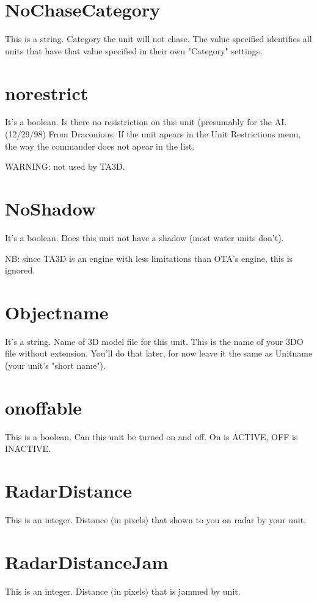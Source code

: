 \documentclass[a4paper,10pt]{article}
\begin{document}
\section{NoChaseCategory}
This is a string. Category the unit will not chase. The value specified identifies all units that have that value specified in their own "Category" settings.

\section{norestrict}
It's a boolean. Is there no resistriction on this unit (presumably for the AI.  (12/29/98) From Draconious:  If the unit apears in the Unit Restrictions menu, the way the commander does not apear in the list.

WARNING: not used by TA3D.

\section{NoShadow}
It's a boolean. Does this unit not have a shadow (most water units don't).

NB: since TA3D is an engine with less limitations than OTA's engine, this is ignored.

\section{Objectname}
It's a string. Name of 3D model file for this unit. This is the name of your 3DO file without extension. You'll do that later, for now leave it the same as Unitname (your unit's "short name").

\section{onoffable}
This is a boolean. Can this unit be turned on and off. On is ACTIVE, OFF is INACTIVE.

\section{RadarDistance}
This is an integer. Distance (in pixels) that shown to you on radar by your unit.

\section{RadarDistanceJam}
This is an integer. Distance (in pixels) that is jammed by unit.
\end{document}
